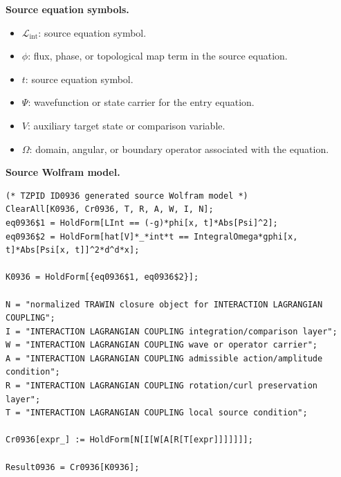 \begin{minipage}[t]{0.49\linewidth}
\begingroup
\small
\raggedright
\textbf{Source equation symbols.}\par
\begin{itemize}[leftmargin=1.35em,itemsep=1pt,topsep=1pt,parsep=0pt]
    \item $\mathcal{L}_{\mathrm{int}}$: source equation symbol.
    \item $\phi$: flux, phase, or topological map term in the source equation.
    \item $t$: source equation symbol.
    \item $\Psi$: wavefunction or state carrier for the entry equation.
    \item $V$: auxiliary target state or comparison variable.
    \item $\Omega$: domain, angular, or boundary operator associated with the equation.
\end{itemize}
\endgroup
\end{minipage}\hfill
\begin{minipage}[t]{0.47\linewidth}
\begingroup
\scriptsize
\raggedright
\textbf{Source Wolfram model.}\par
\begin{Verbatim}[fontsize=\tiny,breaklines=true,breakanywhere=true]
(* TZPID ID0936 generated source Wolfram model *)
ClearAll[K0936, Cr0936, T, R, A, W, I, N];
eq0936$1 = HoldForm[LInt == (-g)*phi[x, t]*Abs[Psi]^2];
eq0936$2 = HoldForm[hat[V]*_*int*t == IntegralOmega*gphi[x, t]*Abs[Psi[x, t]]^2*d^d*x];

K0936 = HoldForm[{eq0936$1, eq0936$2}];

N = "normalized TRAWIN closure object for INTERACTION LAGRANGIAN COUPLING";
I = "INTERACTION LAGRANGIAN COUPLING integration/comparison layer";
W = "INTERACTION LAGRANGIAN COUPLING wave or operator carrier";
A = "INTERACTION LAGRANGIAN COUPLING admissible action/amplitude condition";
R = "INTERACTION LAGRANGIAN COUPLING rotation/curl preservation layer";
T = "INTERACTION LAGRANGIAN COUPLING local source condition";

Cr0936[expr_] := HoldForm[N[I[W[A[R[T[expr]]]]]]];

Result0936 = Cr0936[K0936];
\end{Verbatim}
\endgroup
\end{minipage}

